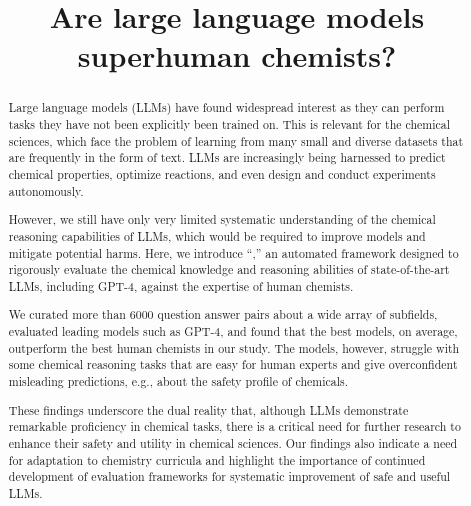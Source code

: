 \documentclass[11pt, oneside]{article}
\title{\textsf{Are large language models superhuman chemists?}}
\begin{document}
\maketitle

\clearpage
\begin{abstract}
    Large language models (LLMs) have found widespread interest as they can perform tasks they have not been explicitly been trained on. 
    This is relevant for the chemical sciences, which face the problem of learning from many small and diverse datasets that are frequently in the form of text.
    LLMs are increasingly being harnessed to predict chemical properties, optimize reactions, and even design and conduct experiments autonomously.

    However, we still have only very limited systematic understanding of the chemical reasoning capabilities of LLMs, which would be required to improve models and mitigate potential harms. 
    Here, we introduce \enquote{\chembench,} an automated framework designed to rigorously evaluate the chemical knowledge and reasoning abilities of state-of-the-art LLMs, including GPT-4, against the expertise of human chemists.

    We curated more than 6000 question answer pairs about a wide array of subfields, evaluated leading models such as GPT-4, and found that the best models, on average, outperform the best human chemists in our study. 
    The models, however, struggle with some chemical reasoning tasks that are easy for human experts and give overconfident misleading predictions, e.g., about the safety profile of chemicals. 

    These findings underscore the dual reality that, although LLMs demonstrate remarkable proficiency in chemical tasks, there is a critical need for further research to enhance their safety and utility in chemical sciences.
    Our findings also indicate a need for adaptation to chemistry curricula and highlight the importance of continued development of evaluation frameworks for systematic improvement of safe and useful LLMs.
\end{abstract}
\end{document}
